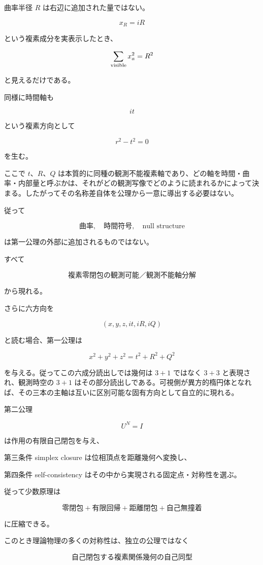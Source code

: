 \documentclass[
  a4paper,
]{ltjsarticle}
\begin{document}
曲率半径 \(R\) は右辺に追加された量ではない。

\[
\boxed{
x_R=iR
}
\]

という複素成分を実表示したとき、

\[
\sum_{\rm visible}x_a^2=R^2
\]

と見えるだけである。

同様に時間軸も

\[
it
\]

という複素方向として

\[
r^2-t^2=0
\]

を生む。

ここで \(t\)、\(R\)、\(Q\)
は本質的に同種の観測不能複素軸であり、どの軸を時間・曲率・内部量と呼ぶかは、それがどの観測写像でどのように読まれるかによって決まる。したがってその名称差自体を公理から一意に導出する必要はない。

従って

\[
\boxed{
\text{曲率}
,\quad
\text{時間符号}
,\quad
\text{null structure}
}
\]

は第一公理の外部に追加されるものではない。

すべて

\[
\boxed{
\text{複素零閉包の観測可能／観測不能軸分解}
}
\]

から現れる。

さらに六方向を

\[
(x,y,z,it,iR,iQ)
\]

と読む場合、第一公理は

\[
\boxed{
x^2+y^2+z^2=t^2+R^2+Q^2
}
\]

を与える。従ってこの六成分読出しでは幾何は \(3+1\) ではなく \(3+3\)
と表現され、観測時空の \(3+1\)
はその部分読出しである。可視側が異方的楕円体となれば、その三本の主軸は互いに区別可能な固有方向として自立的に現れる。

第二公理

\[
U^N=I
\]

は作用の有限自己閉包を与え、

第三条件 simplex closure は位相頂点を距離幾何へ変換し、

第四条件 self-consistency はその中から実現される固定点・対称性を選ぶ。

従って少数原理は

\[
\boxed{
\text{零閉包}
+
\text{有限回帰}
+
\text{距離閉包}
+
\text{自己無撞着}
}
\]

に圧縮できる。

このとき理論物理の多くの対称性は、独立の公理ではなく

\[
\boxed{
\text{自己閉包する複素関係幾何の自己同型}
}
\]
\end{document}
